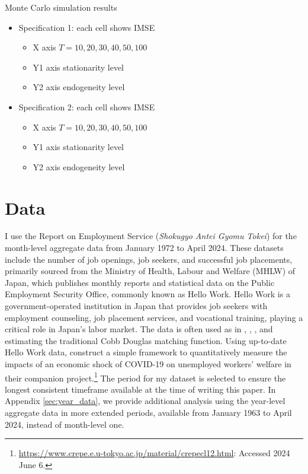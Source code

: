 \documentclass[12pt]{article}
\begin{document}
\begin{frame}{Monte Carlo simulation results}
\begin{itemize}
    \item Specification 1: each cell shows IMSE
    \begin{itemize}
        \item X axis $T=10,20,30,40,50,100$ 
        \item Y1 axis stationarity level
        \item Y2 axis endogeneity level
    \end{itemize}
    \item Specification 2: each cell shows IMSE
    \begin{itemize}
        \item X axis $T=10,20,30,40,50,100$ 
        \item Y1 axis stationarity level
        \item Y2 axis endogeneity level
    \end{itemize}
    
\end{itemize}
    
\end{frame}


\section{Data}

I use the Report on Employment Service (\textit{Shokugyo Antei Gyomu Tokei}) for the month-level aggregate data from January 1972 to April 2024. 
These datasets include the number of job openings, job seekers, and successful job placements, primarily sourced from the Ministry of Health, Labour and Welfare (MHLW) of Japan, which publishes monthly reports and statistical data on the Public Employment Security Office, commonly known as Hello Work. 
Hello Work is a government-operated institution in Japan that provides job seekers with employment counseling, job placement services, and vocational training, playing a critical role in Japan's labor market. 
The data is often used as in \cite{kano2005estimating}, \cite{kambayashi2006vacancy}, \cite{sasaki2008matching}, and \cite{higashi2018spatial} estimating the traditional Cobb Douglas matching function.
Using up-to-date Hello Work data, \cite{kawata2021first} construct a simple framework to quantitatively measure the impacts of an economic shock of COVID-19 on unemployed workers’ welfare in their companion project.\footnote{\url{https://www.crepe.e.u-tokyo.ac.jp/material/crepecl12.html}: Accessed 2024 June 6.} 
The period for my dataset is selected to ensure the longest consistent timeframe available at the time of writing this paper.
In Appendix \ref{sec:year_data}, we provide additional analysis using the year-level aggregate data in more extended periods, available from January 1963 to April 2024, instead of month-level one.
\end{document}

